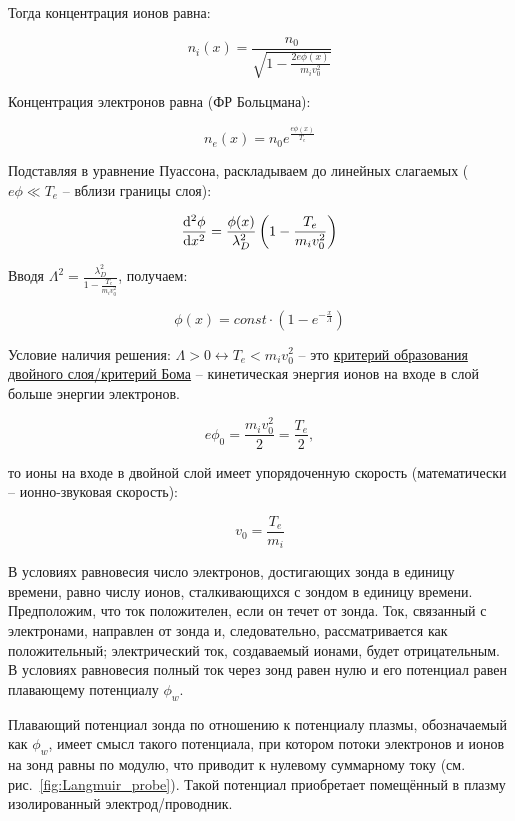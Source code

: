 \documentclass[10pt, a4paper]{article}
\begin{document}
Тогда концентрация ионов равна:

\begin{equation*}
	n_i(x) = \frac{n_0}{\sqrt{1-\frac{2e\phi(x)}{m_iv_0^2}}}
\end{equation*}

Концентрация электронов равна (ФР Больцмана):

\begin{equation*}
	n_e(x) = n_0e^{\frac{e\phi(x)}{T_e}}
\end{equation*}

Подставляя в уравнение Пуассона, раскладываем до линейных слагаемых ($e\phi\ll T_e$ -- вблизи границы слоя):

\begin{equation*}
	\dv[2]{\phi}{x} = \frac{\phi(x)}{\lambda_D^2} \left(1-\frac{T_e}{m_iv_0^2}\right)
\end{equation*}

Вводя $\varLambda^2 = \frac{\lambda_D^2}{1-\frac{T_e}{m_iv_0^2}}$, получаем:

\begin{equation*}
	\phi(x) = const\cdot(1-e^{-\frac{x}{\varLambda}})
\end{equation*}

Условие наличия решения: $\varLambda>0\leftrightarrow T_e<m_iv_0^2$ -- это \uline{критерий образования двойного слоя/критерий Бома} -- кинетическая энергия ионов на входе в слой больше энергии электронов.

\begin{equation*}
	e\phi_0 = \frac{m_iv_0^2}{2} = \frac{T_e}{2},
\end{equation*}

то ионы на входе в двойной слой имеет упорядоченную скорость (математически -- ионно-звуковая скорость): 

\begin{equation*}
	v_0 = \frac{T_e}{m_i}
\end{equation*}

В условиях равновесия число электронов, достигающих зонда в единицу времени, равно числу ионов, сталкивающихся с зондом в единицу времени. Предположим, что ток положителен, если он течет от зонда. Ток, связанный с электронами, направлен от зонда и, следовательно, рассматривается как положительный; электрический ток, создаваемый ионами, будет отрицательным. В условиях равновесия полный ток через зонд равен нулю и его потенциал равен плавающему потенциалу $\phi_w$.

Плавающий потенциал зонда по отношению к потенциалу плазмы, обозначаемый как $\phi_w$, имеет смысл такого потенциала, при котором потоки электронов и ионов на зонд равны по модулю, что приводит к нулевому суммарному току (см. рис.~\ref{fig:Langmuir_probe}). Такой потенциал приобретает помещённый в плазму изолированный электрод/проводник.
\end{document}
